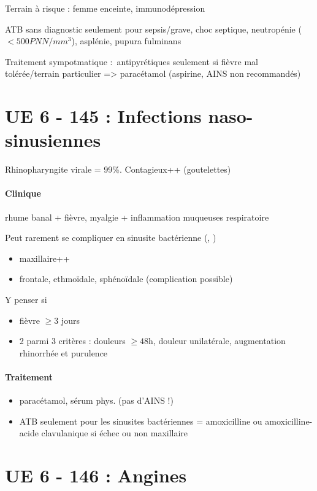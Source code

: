 Terrain à risque : femme enceinte, immunodépression

\danger ATB sans diagnostic seulement pour sepsis/grave, choc septique,
neutropénie (\(< 500 PNN/mm^3\)), asplénie, pupura fulminans

Traitement sympotmatique :~antipyrétiques seulement si fièvre mal
tolérée/terrain particulier =\textgreater{} paracétamol (aspirine, AINS
non recommandés)

\section{UE 6 - 145 : Infections naso-sinusiennes}%
\label{sec:item_145_infections_naso_sinusiennes}

Rhinopharyngite virale =  99\%. Contagieux++ (goutelettes)

\paragraph{Clinique} rhume banal + fièvre, myalgie + inflammation muqueuses respiratoire

Peut rarement se compliquer en sinusite bactérienne (,
)
\begin{itemize}
  \item maxillaire++
  \item frontale, ethmoïdale, sphénoïdale (complication possible)
\end{itemize}
Y penser si 
\begin{itemize}
  \item fièvre $\ge 3$ jours
    \item 2 parmi 3 critères : douleurs $\ge 48$h, douleur unilatérale,
      augmentation rhinorrhée et purulence
\end{itemize}

\paragraph{Traitement}%
\label{par:traitement}
\begin{itemize}
  \item paracétamol, sérum phys. (pas d'AINS !)
  \item ATB seulement pour les sinusites bactériennes = amoxicilline ou
    amoxicilline-acide clavulanique si échec ou non maxillaire
\end{itemize}
\section{UE 6 - 146 : Angines}%
\label{sec:item_146_angines}

